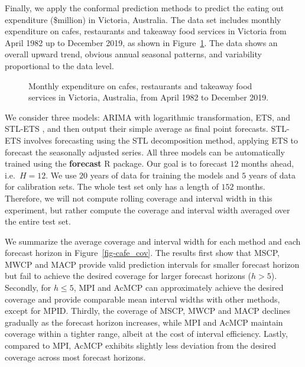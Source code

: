 \documentclass[
  11pt,
  a4paper,
]{article}
\theoremstyle{plain}
\theoremstyle{remark}
\begin{document}
Finally, we apply the conformal prediction methods to predict the eating
out expenditure (\$million) in Victoria, Australia. The data set
includes monthly expenditure on cafes, restaurants and takeaway food
services in Victoria from April 1982 up to December 2019, as shown in
Figure~\ref{fig-cafe_data}. The data shows an overall upward trend,
obvious annual seasonal patterns, and variability proportional to the
data level.

\begin{figure}


\caption{\label{fig-cafe_data}Monthly expenditure on cafes, restaurants
and takeaway food services in Victoria, Australia, from April 1982 to
December 2019.}

\end{figure}%

We consider three models: ARIMA with logarithmic transformation, ETS,
and STL-ETS \autocite{hyndman2021}, and then output their simple average
as final point forecasts. STL-ETS involves forecasting using the STL
decomposition method, applying ETS to forecast the seasonally adjusted
series. All three models can be automatically trained using the
\textbf{forecast} R package. Our goal is to forecast \(12\) months
ahead, i.e.~\(H=12\). We use \(20\) years of data for training the
models and \(5\) years of data for calibration sets. The whole test set
only has a length of \(152\) months. Therefore, we will not compute
rolling coverage and interval width in this experiment, but rather
compute the coverage and interval width averaged over the entire test
set.

We summarize the average coverage and interval width for each method and
each forecast horizon in Figure~\ref{fig-cafe_cov}. The results first
show that MSCP, MWCP and MACP provide valid prediction intervals for
smaller forecast horizon but fail to achieve the desired coverage for
larger forecast horizons (\(h>5\)). Secondly, for \(h \leq 5\), MPI and
AcMCP can approximately achieve the desired coverage and provide
comparable mean interval widths with other methods, except for MPID.
Thirdly, the coverage of MSCP, MWCP and MACP declines gradually as the
forecast horizon increases, while MPI and AcMCP maintain coverage within
a tighter range, albeit at the cost of interval efficiency. Lastly,
compared to MPI, AcMCP exhibits slightly less deviation from the desired
coverage across most forecast horizons.
\end{document}
